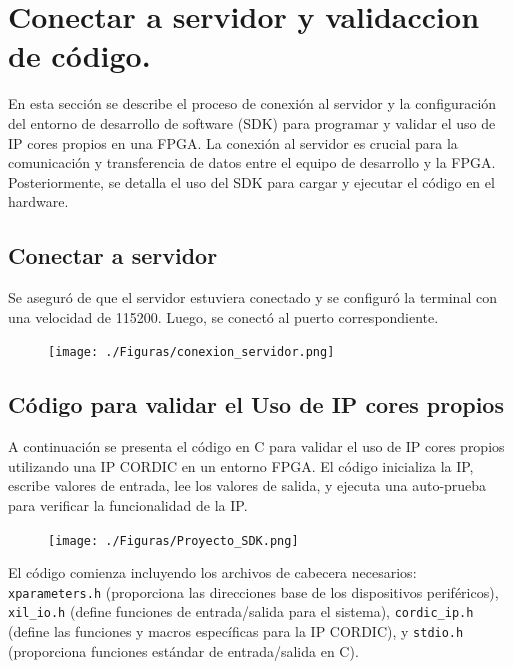 \documentclass[12pt,a4paper, twoside]{article} %
\begin{document}
\section{Conectar a servidor y validaccion de código.}

En esta sección se describe el proceso de conexión al servidor y la configuración del entorno de desarrollo de software (SDK) para programar y validar el uso de IP cores propios en una FPGA. La conexión al servidor es crucial para la comunicación y transferencia de datos entre el equipo de desarrollo y la FPGA. Posteriormente, se detalla el uso del SDK para cargar y ejecutar el código en el hardware.


\subsection{Conectar a servidor}


Se aseguró de que el servidor estuviera conectado y se configuró la terminal con una velocidad de 115200. Luego, se conectó al puerto correspondiente.

\begin{figure}[ht]
\centering
\texttt{[image: ./Figuras/conexion\_servidor.png]}
\label{fig:Conexión a servidor}
\end{figure}



\subsection{Código para validar el Uso de IP cores propios}

A continuación se presenta el código en C para validar el uso de IP cores propios utilizando una IP CORDIC en un entorno FPGA. El código inicializa la IP, escribe valores de entrada, lee los valores de salida, y ejecuta una auto-prueba para verificar la funcionalidad de la IP.


\begin{figure}[ht]
\centering
\texttt{[image: ./Figuras/Proyecto\_SDK.png]}
\label{fig:Visualizacion de codigo c en SDK}
\end{figure}


El código comienza incluyendo los archivos de cabecera necesarios: \texttt{xparameters.h} (proporciona las direcciones base de los dispositivos periféricos), \texttt{xil\_io.h} (define funciones de entrada/salida para el sistema), \texttt{cordic\_ip.h} (define las funciones y macros específicas para la IP CORDIC), y \texttt{stdio.h} (proporciona funciones estándar de entrada/salida en C). 
\end{document}
